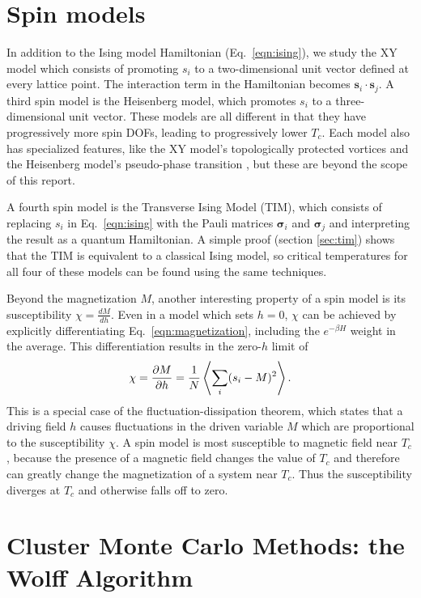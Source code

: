 \documentclass[
  amsmath,
  amssymb,
  aps,
  twocolumn,
  nofootinbib,
  nolongbibliography,
  floatfix,
]{revtex4-2}
\begin{document}
\section{Spin models}
\label{sec:spin-models}

In addition to the Ising model Hamiltonian (Eq.~\ref{eqn:ising}), we study the XY model which consists of promoting $s_i$ to a two-dimensional unit vector defined at every lattice point. The interaction term in the Hamiltonian becomes $\bm s_i \cdot \bm s_j$. A third spin model is the Heisenberg model, which promotes $s_i$ to a three-dimensional unit vector. These models are all different in that they have progressively more spin DOFs, leading to progressively lower $T_c$. Each model also has specialized features, like the XY model's topologically protected vortices and the Heisenberg model's pseudo-phase transition \cite{tomita2014finite}, but these are beyond the scope of this report.

A fourth spin model is the Transverse Ising Model (TIM), which consists of replacing $s_i$ in Eq.~\ref{eqn:ising} with the Pauli matrices $\bm \sigma_i$ and $\bm \sigma_j$ and interpreting the result as a quantum Hamiltonian. A simple proof (section \ref{sec:tim}) shows that the TIM is equivalent to a classical Ising model, so critical temperatures for all four of these models can be found using the same techniques.

Beyond the magnetization $M$, another interesting property of a spin model is its susceptibility $\chi = \frac{dM}{dh}$. Even in a model which sets $h=0$, $\chi$ can be achieved by explicitly differentiating Eq.~\ref{eqn:magnetization}, including the $e^{-\beta H}$ weight in the average. This differentiation results in the zero-$h$ limit of
\begin{equation}
  \chi = \frac{\partial M}{\partial h} = \frac{1}{N}\Braket{\sum_i(s_i - M)^2}.
\end{equation}
This is a special case of the fluctuation-dissipation theorem, which states that a driving field $h$ causes fluctuations in the driven variable $M$ which are proportional to the susceptibility $\chi$. A spin model is most susceptible to magnetic field near $T_c$, because the presence of a magnetic field changes the value of $T_c$ and therefore can greatly change the magnetization of a system near $T_c$. Thus the susceptibility diverges at $T_c$ and otherwise falls off to zero.


\section{Cluster Monte Carlo Methods: the Wolff Algorithm}
\label{sec:wolff}
\end{document}

